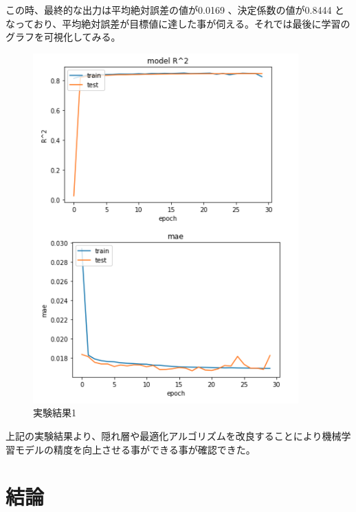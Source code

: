 \documentclass{article}
\begin{document}
この時、最終的な出力は平均絶対誤差の値が0.0169 、決定係数の値が0.8444 となっており、平均絶対誤差が目標値に達した事が伺える。それでは最後に学習のグラフを可視化してみる。
\\


\begin{figure}[H]
\begin{center}
\includegraphics[width=\linewidth]{experiment2.png}
\caption{実験結果1}
\end{center}
\end{figure}


上記の実験結果より、隠れ層や最適化アルゴリズムを改良することにより機械学習モデルの精度を向上させる事ができる事が確認できた。


\section{結論}




 \citep{adams1995hitchhiker}



\end{document}
